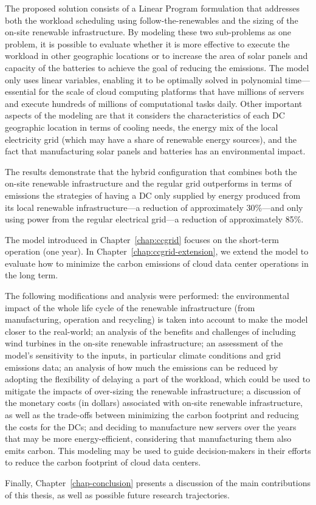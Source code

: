 The proposed solution consists of a Linear Program formulation that addresses both the workload scheduling using follow-the-renewables and the sizing of the on-site renewable infrastructure. By modeling these two sub-problems as one problem, it is possible to evaluate whether it is more effective to execute the workload in other geographic locations or to increase the area of solar panels and capacity of the batteries to achieve the goal of reducing the  emissions. The model only uses linear variables, enabling it to be optimally solved in polynomial time---essential for the scale of cloud computing platforms that have millions of servers and execute hundreds of millions of computational tasks daily. Other important aspects of the modeling are that it considers the characteristics of each DC geographic location in terms of cooling needs, the energy mix of the local electricity grid (which may have a share of renewable energy sources), and the fact that manufacturing solar panels and batteries has an environmental impact. 

The results demonstrate that the hybrid configuration that combines both the on-site renewable infrastructure and the regular grid outperforms in terms of  emissions the strategies of having a DC only supplied by energy produced from its local renewable infrastructure---a reduction of approximately 30\%---and only using power from the regular electrical grid---a reduction of approximately 85\%.


The model introduced in Chapter~\ref{chap:ccgrid} focuses on the short-term operation (one year). In Chapter~\ref{chap:ccgrid-extension}, we extend the model to evaluate how to minimize the carbon emissions of cloud data center operations in the long term. 

The following modifications and analysis were performed: the environmental impact of the whole life cycle of the renewable infrastructure (from manufacturing, operation and recycling) is taken into account to make the model closer to the real-world; an analysis of the benefits and challenges of including wind turbines in the on-site renewable infrastructure; an assessment of the model's sensitivity to the inputs, in particular climate conditions and grid emissions data; an analysis of how much the  emissions can be reduced by adopting the flexibility of delaying a part of the workload, which could be used to mitigate the impacts of over-sizing the renewable infrastructure; a discussion of the monetary costs (in dollars) associated with on-site renewable infrastructure, as well as the trade-offs between minimizing the carbon footprint and reducing the costs for the DCs; and deciding to manufacture new servers over the years that may be more energy-efficient, considering that manufacturing them also emits carbon. This modeling may be used to guide decision-makers in their efforts to reduce the carbon footprint of cloud data centers.

Finally, Chapter~\ref{chap-conclusion} presents a discussion of the main contributions of this thesis, as well as possible future research trajectories.